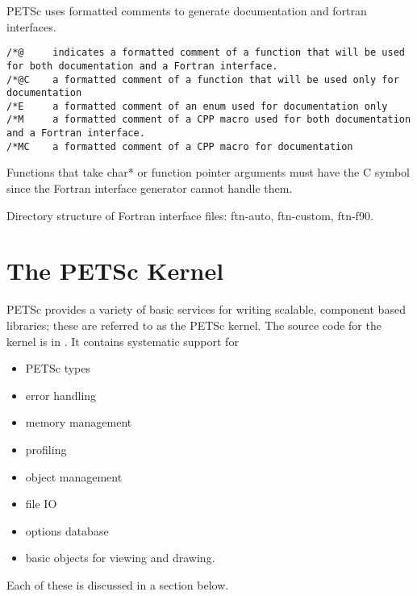 \documentclass[twoside,12pt]{../sty/report_petsc}
\begin{document}
PETSc uses formatted comments to generate documentation and fortran interfaces.

\begin{verbatim}
/*@     indicates a formatted comment of a function that will be used for both documentation and a Fortran interface.
/*@C    a formatted comment of a function that will be used only for documentation
/*E     a formatted comment of an enum used for documentation only
/*M     a formatted comment of a CPP macro used for both documentation and a Fortran interface.
/*MC    a formatted comment of a CPP macro for documentation
\end{verbatim}

Functions that take char* or function pointer arguments must have the C symbol since the Fortran interface generator cannot handle them.

Directory structure of Fortran interface files: ftn-auto, ftn-custom, ftn-f90.

\chapter{The PETSc Kernel}
\label{chapter:kernel}
PETSc provides a variety of basic services for writing scalable, component
based libraries; these are referred to as the PETSc kernel. The source
code for the kernel is in . It contains systematic support for
\begin{itemize}
  \item PETSc types
  \item error handling
  \item memory management
  \item profiling
  \item object management
  \item file IO
  \item options database
  \item basic objects for viewing and drawing.
\end{itemize}
Each of these is discussed in a section below.

\end{document}

